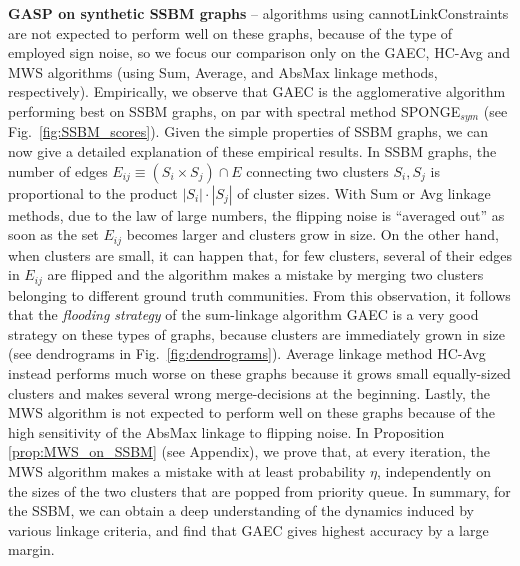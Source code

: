 \textbf{GASP on synthetic SSBM graphs}  -- 
\algname{} algorithms using cannotLinkConstraints are not expected to perform well on these graphs, because of the type of employed sign noise, so we focus our comparison only on the GAEC, HC-Avg and MWS algorithms (using Sum, Average, and AbsMax linkage methods, respectively).
Empirically, we observe that GAEC is the agglomerative algorithm performing best on SSBM graphs, on par with spectral method SPONGE$_{sym}$ (see Fig.~\ref{fig:SSBM_scores}). Given the simple properties of SSBM graphs, we can now give a detailed explanation of these empirical results. 
In SSBM graphs, the number of edges $E_{ij}\equiv(S_i\times S_j)\cap E$ connecting two clusters $S_i,S_j$ is  proportional to the product $|S_i|\cdot|S_j|$ of cluster sizes. 
With Sum or Avg linkage methods, due to the law of large numbers, the flipping noise is ``averaged out'' as soon as the set $E_{ij}$ becomes larger and clusters grow in size.
On the other hand, when clusters are small, it can happen that, for few clusters, several of their edges in $E_{ij}$ are flipped and the algorithm makes a mistake by merging two clusters belonging to different ground truth communities. From this observation, it follows that the \emph{flooding strategy} of the sum-linkage algorithm GAEC is a very good strategy on these types of graphs, because clusters are immediately grown in size (see dendrograms in Fig.~\ref{fig:dendrograms}). Average linkage method HC-Avg instead performs much worse on these graphs because it grows small equally-sized clusters and makes several wrong merge-decisions at the beginning. 
Lastly, the MWS algorithm is not expected to perform well on these graphs because of the high sensitivity of the AbsMax linkage to flipping noise. In Proposition \ref{prop:MWS_on_SSBM} (see Appendix), we prove that, at every iteration, the MWS algorithm makes a mistake with at least probability $\eta$, independently on the sizes of the two clusters that are popped from priority queue.
In summary, for the SSBM, we can obtain a deep understanding of the dynamics induced by various linkage criteria, and find that GAEC gives highest accuracy by a large margin.





